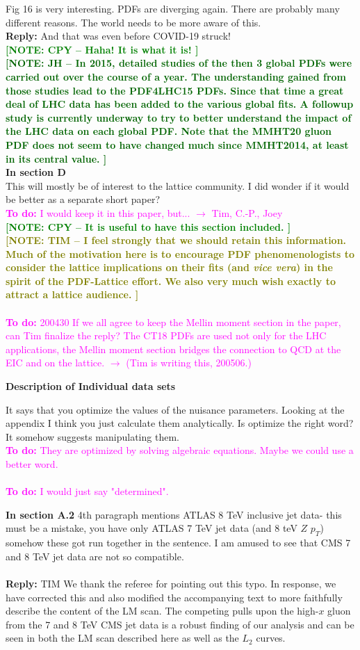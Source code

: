 \documentclass[aps,prd,amsmath,nofootinbib,floatfix,fleqn]{revtex4}
\newcommand{\TODO}[1]{\textcolor{magenta}{
\quad\vspace{3pt} \\ {\bf To do:} #1 \\
}}
\newcommand{\REPLY}[1]{\textcolor{redish}{\quad \\
{\bf Reply:} #1 \\
}}
\newcommand{\NOTECPY}[1]{\textcolor{green}{ \bf[NOTE: CPY -- #1 ]}}
\newcommand{\NOTEJH}[1]{\textcolor{darkgreen}{ \bf[NOTE: JH -- #1 ]}}
\newcommand{\NOTETIM}[1]{\textcolor{olive}{ \bf[NOTE: TIM -- #1 ]}}
\begin{document}
\noindent
Fig 16 is very interesting. PDFs are diverging again. There are probably many different reasons. The world needs to be more aware of this.
\REPLY{And that was even before COVID-19 struck!}
\NOTECPY{Haha! It is what it is!}\\
\NOTEJH{In 2015, detailed studies of the then 3 global PDFs were carried out over the course of a year. The understanding gained from those studies lead to the PDF4LHC15 PDFs. Since that time a great deal of LHC data has been added to the various global fits. A followup study is currently underway to try to better understand the impact of the LHC data on each global PDF. Note that the MMHT20 gluon PDF does not seem to have changed much since MMHT2014, at least in its central value.}\\


\noindent
{\bf In section D}\\
This will mostly be of interest to the lattice community. I did wonder if it would be better as a
separate short paper?
\TODO{I would keep it in this paper, but... $\to$ Tim, C.-P., Joey}
\NOTECPY{It is useful to have this section included.}\\
\NOTETIM{I feel strongly that we should retain this information.  Much of the motivation
here is to encourage PDF phenomenologists to consider the lattice implications on their
fits (and {\it vice vera}) in the spirit of the PDF-Lattice effort.  We also very much
wish exactly to attract a lattice audience.}\\
\TODO{200430 If we all agree to keep the Mellin moment section in the paper, can Tim finalize the reply? The CT18 PDFs are used not only for the LHC applications, the Mellin moment section bridges the connection to QCD at the EIC and on the lattice. $\to$ (Tim is writing this, 200506.)}

{\bf Description of Individual data sets}

It says that you optimize the values of the nuisance parameters. Looking at the appendix I think you just calculate them analytically. Is optimize the right word? It somehow suggests manipulating them.
\TODO{They are optimized by solving algebraic equations. Maybe we could use a better word.}
\TODO{I would just say "determined".}

\noindent
{\bf In section A.2} 4th paragraph mentions ATLAS 8 TeV inclusive jet data- this must be a mistake, you have only ATLAS 7 TeV jet data (and 8 teV $Z$ $p_T$) somehow these got run together in the sentence.
I am amused to see that CMS 7 and 8 TeV jet data are not so compatible. \\
%
\REPLY{TIM We thank the referee for pointing out this typo.  In response, we have corrected
this and also modified the accompanying text to more faithfully describe the content of the LM scan. The competing pulls upon the high-$x$ gluon from the 7 and 8 TeV CMS jet data is a robust finding of our analysis and can be seen in both the LM scan described here as well as the $L_2$ curves.}\\
\end{document}
